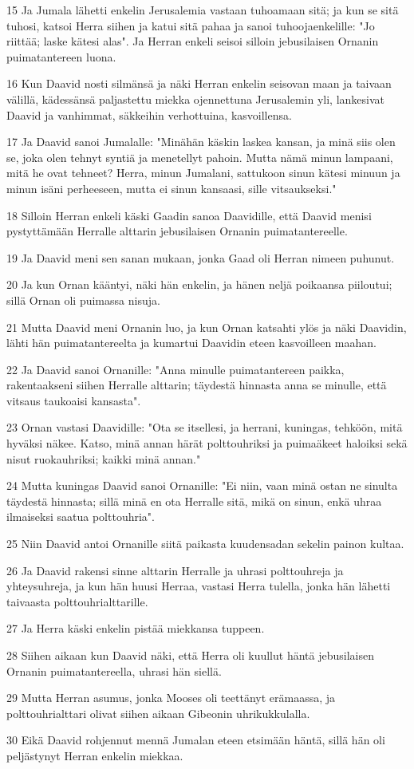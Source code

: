\par 15 Ja Jumala lähetti enkelin Jerusalemia vastaan tuhoamaan sitä; ja kun se sitä tuhosi, katsoi Herra siihen ja katui sitä pahaa ja sanoi tuhoojaenkelille: "Jo riittää; laske kätesi alas". Ja Herran enkeli seisoi silloin jebusilaisen Ornanin puimatantereen luona.
\par 16 Kun Daavid nosti silmänsä ja näki Herran enkelin seisovan maan ja taivaan välillä, kädessänsä paljastettu miekka ojennettuna Jerusalemin yli, lankesivat Daavid ja vanhimmat, säkkeihin verhottuina, kasvoillensa.
\par 17 Ja Daavid sanoi Jumalalle: "Minähän käskin laskea kansan, ja minä siis olen se, joka olen tehnyt syntiä ja menetellyt pahoin. Mutta nämä minun lampaani, mitä he ovat tehneet? Herra, minun Jumalani, sattukoon sinun kätesi minuun ja minun isäni perheeseen, mutta ei sinun kansaasi, sille vitsaukseksi."
\par 18 Silloin Herran enkeli käski Gaadin sanoa Daavidille, että Daavid menisi pystyttämään Herralle alttarin jebusilaisen Ornanin puimatantereelle.
\par 19 Ja Daavid meni sen sanan mukaan, jonka Gaad oli Herran nimeen puhunut.
\par 20 Ja kun Ornan kääntyi, näki hän enkelin, ja hänen neljä poikaansa piiloutui; sillä Ornan oli puimassa nisuja.
\par 21 Mutta Daavid meni Ornanin luo, ja kun Ornan katsahti ylös ja näki Daavidin, lähti hän puimatantereelta ja kumartui Daavidin eteen kasvoilleen maahan.
\par 22 Ja Daavid sanoi Ornanille: "Anna minulle puimatantereen paikka, rakentaakseni siihen Herralle alttarin; täydestä hinnasta anna se minulle, että vitsaus taukoaisi kansasta".
\par 23 Ornan vastasi Daavidille: "Ota se itsellesi, ja herrani, kuningas, tehköön, mitä hyväksi näkee. Katso, minä annan härät polttouhriksi ja puimaäkeet haloiksi sekä nisut ruokauhriksi; kaikki minä annan."
\par 24 Mutta kuningas Daavid sanoi Ornanille: "Ei niin, vaan minä ostan ne sinulta täydestä hinnasta; sillä minä en ota Herralle sitä, mikä on sinun, enkä uhraa ilmaiseksi saatua polttouhria".
\par 25 Niin Daavid antoi Ornanille siitä paikasta kuudensadan sekelin painon kultaa.
\par 26 Ja Daavid rakensi sinne alttarin Herralle ja uhrasi polttouhreja ja yhteysuhreja, ja kun hän huusi Herraa, vastasi Herra tulella, jonka hän lähetti taivaasta polttouhrialttarille.
\par 27 Ja Herra käski enkelin pistää miekkansa tuppeen.
\par 28 Siihen aikaan kun Daavid näki, että Herra oli kuullut häntä jebusilaisen Ornanin puimatantereella, uhrasi hän siellä.
\par 29 Mutta Herran asumus, jonka Mooses oli teettänyt erämaassa, ja polttouhrialttari olivat siihen aikaan Gibeonin uhrikukkulalla.
\par 30 Eikä Daavid rohjennut mennä Jumalan eteen etsimään häntä, sillä hän oli peljästynyt Herran enkelin miekkaa.

